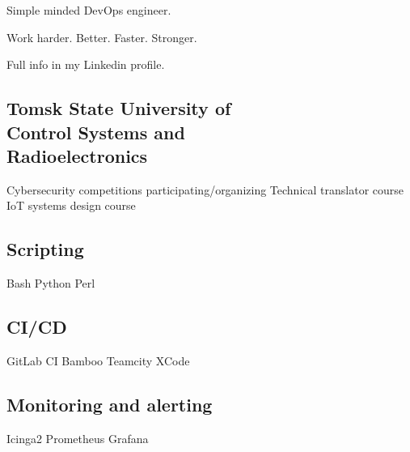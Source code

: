 \documentclass[a4paper]{MagicalCV}
\begin{document}
\lastupdated


\begin{minipage}[t]{0.33\textwidth} 


Simple minded DevOps engineer. 

Work harder. Better. Faster. Stronger.

Full info in my Linkedin profile.
\sectionsep




\sectionsep


\subsection{Tomsk State University of \\ Control Systems and \\ Radioelectronics}
\vspace{\topsep} %
Cybersecurity competitions participating/organizing \textbullet{} Technical translator course \textbullet{} IoT systems design course
\sectionsep


\subsection{Scripting}
Bash \textbullet{} Python \textbullet{} Perl 
\subsection{CI/CD}
GitLab CI \textbullet{} Bamboo \textbullet{} Teamcity \textbullet{} XCode
\subsection{Monitoring and alerting}
Icinga2 \textbullet{} Prometheus \textbullet{} Grafana

\end{minipage}
\end{document}
